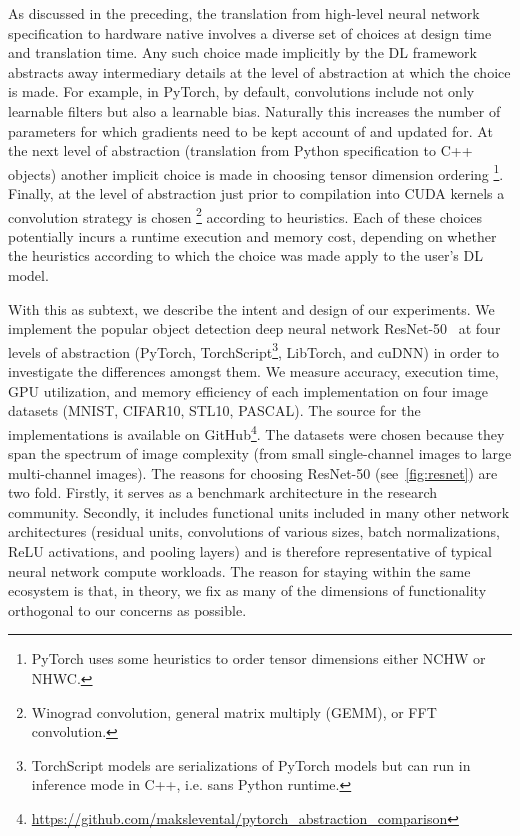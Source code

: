 As discussed in the preceding, the translation from high-level neural network specification to hardware native involves a diverse set of choices at design time and translation time.
Any such choice made implicitly by the DL framework abstracts away intermediary details at the level of abstraction at which the choice is made.
For example, in PyTorch, by default, convolutions include not only learnable filters but also a learnable bias.
Naturally this increases the number of parameters for which gradients need to be kept account of and updated for.
At the next level of abstraction (translation from Python specification to C++ objects) another implicit choice is made in choosing tensor dimension ordering%
\footnote{PyTorch uses some heuristics to order tensor dimensions either NCHW or NHWC.}.
Finally, at the level of abstraction just prior to compilation into CUDA kernels a convolution strategy is chosen%
\footnote{Winograd convolution, general matrix multiply (GEMM), or FFT convolution.} according to heuristics.
Each of these choices potentially incurs a runtime execution and memory cost, depending on whether the heuristics according to which the choice was made apply to the user's DL model.

With this as subtext, we describe the intent and design of our experiments.
We implement the popular object detection deep neural network ResNet-50~\cite{he2015deep} at four levels of abstraction (PyTorch, TorchScript\footnote{TorchScript models are serializations of PyTorch models but can run in inference mode in C++, i.e. sans Python runtime.}, LibTorch, and cuDNN) in order to investigate the differences amongst them.
We measure accuracy, execution time, GPU utilization, and memory efficiency of each implementation on four image datasets (MNIST, CIFAR10, STL10, PASCAL).
The source for the implementations is available on GitHub\footnote{\url{https://github.com/makslevental/pytorch_abstraction_comparison}}.
The datasets were chosen because they span the spectrum of image complexity (from small single-channel images to large multi-channel images).
The reasons for choosing ResNet-50 (see~\cref{fig:resnet}) are two fold.
Firstly, it serves as a benchmark architecture in the research community.
Secondly, it includes functional units included in many other network architectures (residual units, convolutions of various sizes, batch normalizations, ReLU activations, and pooling layers) and is therefore representative of typical neural network compute workloads.
The reason for staying within the same ecosystem is that, in theory, we fix as many of the dimensions of functionality orthogonal to our concerns as possible.

